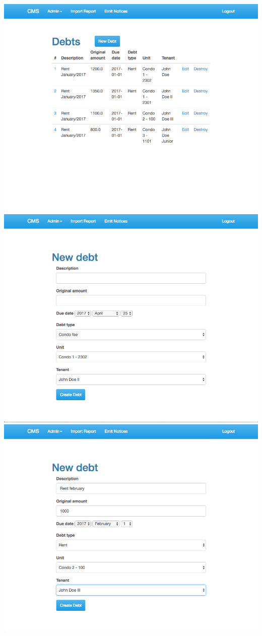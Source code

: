 \begin{itemize}
    \includegraphics[scale=0.25]{./images/ss/debt/create/2.png}\\
    \includegraphics[scale=0.25]{./images/ss/debt/create/3.png}
    \includegraphics[scale=0.25]{./images/ss/debt/create/4.png}\\

\end{itemize}
